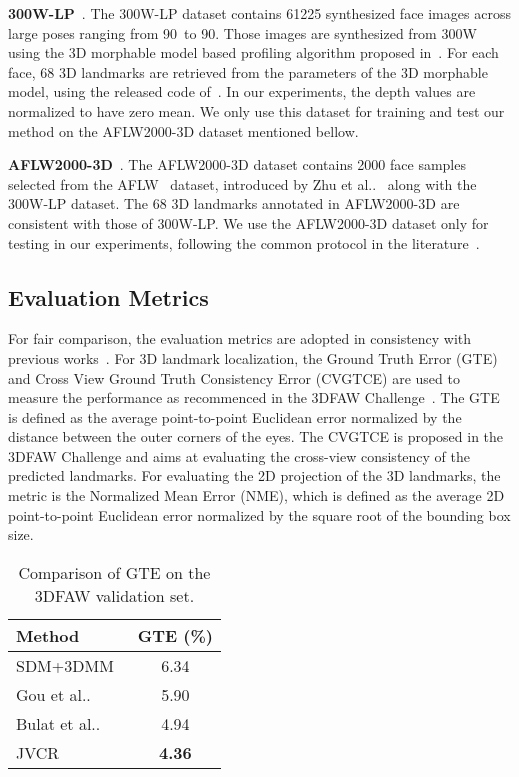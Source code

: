 \documentclass[a4paper,conference]{IEEEtran}
\makeatletter
\DeclareRobustCommand\onedot{\futurelet\@let@token\@onedot}
\def\@onedot{\ifx\@let@token.\else.\null\fi\xspace}
\def\etal{{et al}\onedot}
\makeatother
\begin{document}
\textbf{300W-LP}~\cite{zhu2016face}. The 300W-LP dataset contains 61225 synthesized face images across large poses ranging from 90\degree~to 90\degree. 
Those images are synthesized from 300W~\cite{sagonas2013300} using the 3D morphable model based profiling algorithm proposed in~\cite{zhu2016face}.
For each face, 68 3D landmarks are retrieved from the parameters of the 3D morphable model, using the released code of~\cite{zhu2016face}.
In our experiments, the depth values are normalized to have zero mean.
We only use this dataset for training and test our method on the AFLW2000-3D dataset mentioned bellow.

\textbf{AFLW2000-3D}~\cite{zhu2016face}. The AFLW2000-3D dataset contains 2000 face samples selected from the AFLW~\cite{kostinger2011annotated} dataset, introduced by Zhu \etal~\cite{zhu2016face} along with the 300W-LP dataset.
The 68 3D landmarks annotated in AFLW2000-3D are consistent with those of 300W-LP.
We use the AFLW2000-3D dataset only for testing in our experiments, following the common protocol in the literature~\cite{zhu2016face,Bhagavatula2017Faster}.

\subsection{Evaluation Metrics}
For fair comparison, the evaluation metrics are adopted in consistency with previous works~\cite{jeni2016first,zhu2016face}.
For 3D landmark localization, the Ground Truth Error (GTE) and Cross View Ground Truth Consistency Error (CVGTCE) are used to measure the performance as recommenced in the 3DFAW Challenge~\cite{jeni2016first}. 
The GTE is defined as the average point-to-point Euclidean error normalized by the distance between the outer corners of the eyes.
The CVGTCE is proposed in the 3DFAW Challenge and aims at evaluating the cross-view consistency of the predicted landmarks.
For evaluating the 2D projection of the 3D landmarks, the metric is the Normalized Mean Error (NME), which is defined as the average 2D point-to-point Euclidean error normalized by the square root of the bounding box size. 


\begin{table}[h]
	\centering
	\caption{Comparison of GTE on the 3DFAW validation set. }
	\begin{tabular}{lc}
		\toprule
		Method & GTE (\%) \\
		\midrule
		SDM+3DMM~\cite{gou2016shape} & 6.34 \\
		Gou \etal~\cite{gou2016shape} & 5.90 \\
		Bulat \etal~\cite{bulat2016two} & 4.94 \\
		\midrule
		JVCR  & \bf 4.36 \\
		\bottomrule
	\end{tabular}\label{tab:cmp3DFAWvalid}\end{table}
\end{document}
